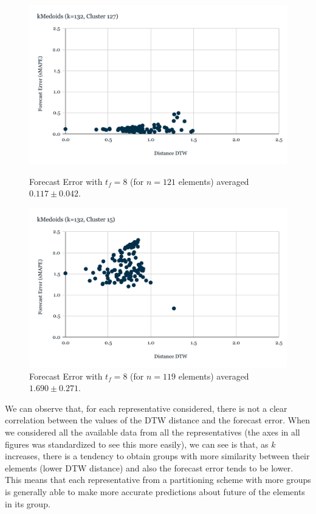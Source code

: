 \begin{figure}[!htbp]
  \centering
  \begin{minipage}[b]{0.45\textwidth}
    \includegraphics[width=\textwidth]{../Figures/distDTW_ForecastError_k132_c127}
    \caption{Forecast Error with $t_{f}=8$ (for $n=121$ elements) averaged $0.117 \pm 0.042$.}
    \label{Fig:DTWsMAPE_k132_c127}
  \end{minipage}
  \hfill
  \begin{minipage}[b]{0.45\textwidth}
    \includegraphics[width=\textwidth]{../Figures/distDTW_ForecastError_k132_c15}
    \caption{Forecast Error with $t_{f}=8$ (for $n=119$ elements) averaged $1.690 \pm 0.271$.}
    \label{Fig:DTWsMAPE_k132_c15}
  \end{minipage}
\end{figure}

We can observe that, for each representative considered, there is not a clear correlation between the values of the DTW distance and the forecast error. When we considered all the available data from all the representatives (the axes in all figures was standardized to see this more easily), we can see is that, as $k$ increases, there is a tendency to obtain groups with more similarity between their elements (lower DTW distance) and also the forecast error tends to be lower. This means that each representative from a partitioning scheme with more groups is generally able to make more accurate predictions about future of the elements in its group.

